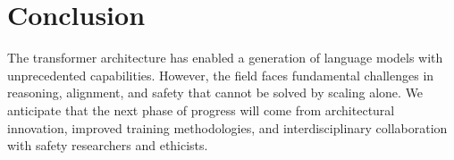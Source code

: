 \documentclass[
    language=english,
    doctype=review-article,
    institution=none,
]{../../omnilatex}
\begin{document}
\section{Conclusion}
\label{sec:conclusion}

The transformer architecture has enabled a generation of language models with
unprecedented capabilities. However, the field faces fundamental challenges
in reasoning, alignment, and safety that cannot be solved by scaling alone.
We anticipate that the next phase of progress will come from architectural
innovation, improved training methodologies, and interdisciplinary
collaboration with safety researchers and ethicists.



\end{document}
